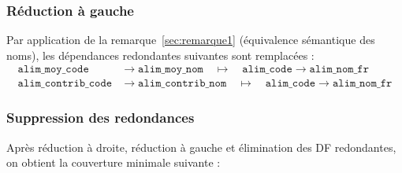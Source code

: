\documentclass[12pt, a4paper]{article}
\newcommand{\attr}[1]{\texttt{#1}}
\begin{document}
    \subsubsection*{Réduction à gauche}

    Par application de la remarque~\ref{sec:remarque1} (équivalence sémantique des noms), les dépendances
    redondantes suivantes sont remplacées :
    \begin{align*}
        \attr{alim\_moy\_code}    &\rightarrow \attr{alim\_moy\_nom}
        \quad \longmapsto \quad \attr{alim\_code} \rightarrow \attr{alim\_nom\_fr} \\
        \attr{alim\_contrib\_code}&\rightarrow \attr{alim\_contrib\_nom}
        \quad \longmapsto \quad \attr{alim\_code} \rightarrow \attr{alim\_nom\_fr}
    \end{align*}

    \subsubsection*{Suppression des redondances}

    Après réduction à droite, réduction à gauche et élimination des DF redondantes, on obtient la
    couverture minimale suivante :
\end{document}
